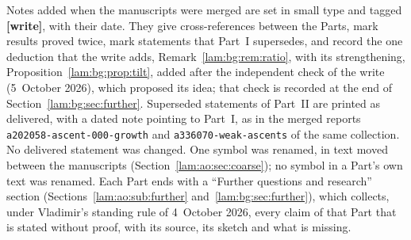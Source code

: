 \documentclass[11pt,a4paper]{article}
\numberwithin{equation}{section}
\theoremstyle{remark}
\newcommand{\file}[1]{\nolinkurl{#1}}
\begin{document}
Notes added when the manuscripts were merged are set in small type and tagged \textbf{[write]}, with their date. They give cross-references between the Parts, mark results proved twice, mark statements that Part~I supersedes, and record the one deduction that the write adds, Remark~\ref{lam:bg:rem:ratio}, with its strengthening, Proposition~\ref{lam:bg:prop:tilt}, added after the independent check of the write (5~October 2026), which proposed its idea; that check is recorded at the end of Section~\ref{lam:bg:sec:further}. Superseded statements of Part~II are printed as delivered, with a dated note pointing to Part~I, as in the merged reports \file{a202058-ascent-000-growth} and \file{a336070-weak-ascents} of the same collection. No delivered statement was changed. One symbol was renamed, in text moved between the manuscripts (Section~\ref{lam:ao:sec:coarse}); no symbol in a Part's own text was renamed. Each Part ends with a ``Further questions and research'' section (Sections~\ref{lam:ao:sub:further} and~\ref{lam:bg:sec:further}), which collects, under Vladimir's standing rule of 4~October 2026, every claim of that Part that is stated without proof, with its source, its sketch and what is missing.
\end{document}

